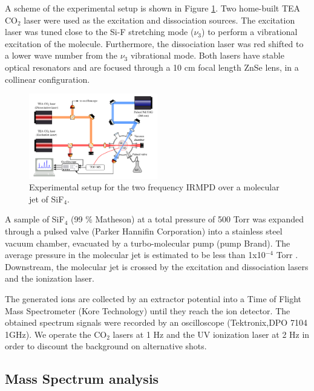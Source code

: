 \documentclass[global,twocolumn]{svjour}
\begin{document}
A scheme of the experimental setup is shown in Figure \ref{fig:setup}. Two home-built TEA CO$_{2}$ laser were used as the excitation and dissociation sources. The excitation laser was tuned close to the Si-F stretching mode ($\nu_{3}$) to perform a vibrational excitation of the molecule. Furthermore, the dissociation laser was red shifted to a lower wave number from the $\nu_{3}$ vibrational mode. Both lasers have stable optical resonators and are focused through a 10 cm focal length ZnSe lens, in a collinear configuration.

\begin{figure}[h]
	\includegraphics[width = 0.5\textwidth]{figures/dispositivo_2f_english.pdf}%
	\caption{\label{fig:setup} Experimental setup for the two frequency IRMPD over a molecular jet of SiF$_{4}$.}
\end{figure}

A sample of SiF$_{4}$ (99 \% Matheson) at a total pressure of 500 Torr was expanded through a pulsed valve (Parker Hannifin Corporation) into a stainless steel vacuum chamber, evacuated by a turbo-molecular pump (pump Brand). The average pressure in the molecular jet is estimated to be less than 1x10$^{-4}$ Torr \cite{bishop09}. Downstream, the molecular jet is crossed by the excitation and dissociation lasers and the ionization laser.

The generated ions are collected by an extractor potential into a Time of Flight Mass Spectrometer (Kore Technology) until they reach the ion detector. The obtained spectrum signals were recorded by an oscilloscope (Tektronix,DPO 7104 1GHz). We operate the CO$_{2}$ lasers at 1 Hz and the UV ionization laser at 2 Hz in order to discount the background on alternative shots.

\subsection{Mass Spectrum analysis}
\end{document}
